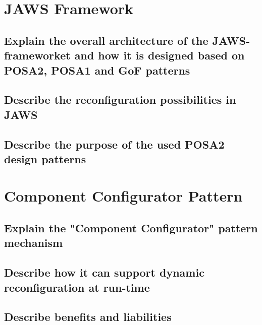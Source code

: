 \documentclass{article}
\begin{document}
\newpage
\section{JAWS Framework}

\subsection{Explain the overall architecture of the JAWS-frameworket and how it is designed based on POSA2, POSA1 and GoF patterns}


\subsection{Describe the reconfiguration possibilities in JAWS}


\subsection{Describe the purpose of the used POSA2 design patterns}




\newpage
\section{Component Configurator Pattern}

\subsection{Explain the "Component Configurator" pattern mechanism}


\subsection{Describe how it can support dynamic reconfiguration at run-time}


\subsection{Describe benefits and liabilities}
\end{document}
